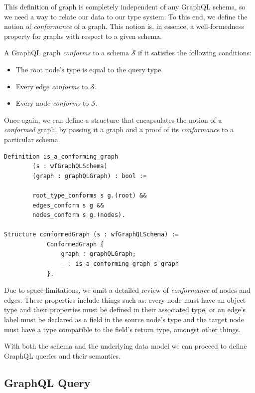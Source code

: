 This definition of graph is completely independent of any GraphQL schema, so we need a way to relate our data to our type system. To this end, we define the notion of \textit{conformance} of a graph. This notion is, in essence, a well-formedness property for graphs with respect to a given schema.

\begin{definition}
A GraphQL graph \textit{conforms} to a schema $\mathcal{S}$ if it satisfies the following conditions:
\begin{itemize}
    \item The root node's type is equal to the query type.
    \item Every edge \textit{conforms} to $\mathcal{S}$.
    \item Every node \textit{conforms} to $\mathcal{S}$.
\end{itemize}
\end{definition}

Once again, we can define a structure that encapsulates the notion of a \textit{conformed} graph, by passing it a graph and a proof of its \textit{conformance} to a particular schema. 

\begin{verbatim}
Definition is_a_conforming_graph
        (s : wfGraphQLSchema)
        (graph : graphQLGraph) : bool :=

        root_type_conforms s g.(root) &&
        edges_conform s g &&
        nodes_conform s g.(nodes).

Structure conformedGraph (s : wfGraphQLSchema) :=
            ConformedGraph {
                graph : graphQLGraph;
                _ : is_a_conforming_graph s graph
            }.
\end{verbatim}

Due to space limitations, we omit a detailed review of \textit{conformance} of nodes and edges. These properties include things such as: every node must have an object type and their properties must be defined in their associated type, or an edge's label must be declared as a field in the source node's type and the target node must have a type compatible to the field's return type, amongst other things.

With both the schema and the underlying data model we can proceed to define GraphQL queries and their semantics.

\subsection{GraphQL Query}

